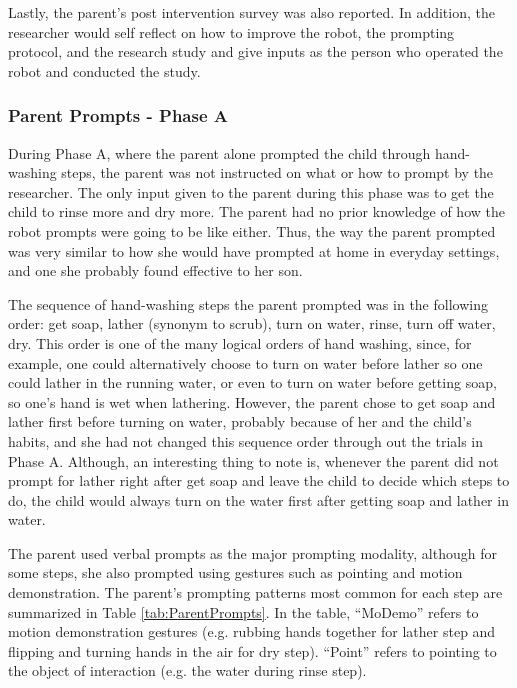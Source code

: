 Lastly, the parent's post intervention survey was also reported.  In addition, the researcher would self reflect on how to improve the robot, the prompting protocol, and the research study and give inputs as the person who operated the robot and conducted the study.

\subsubsection{Parent Prompts - Phase A}
During Phase A, where the parent alone prompted the child through hand-washing steps, the parent was not instructed on what or how to prompt by the researcher.  The only input given to the parent during this phase was to get the child to rinse more and dry more.  The parent had no prior knowledge of how the robot prompts were going to be like either.  Thus, the way the parent prompted was very similar to how she would have prompted at home in everyday settings, and one she probably found effective to her son.

The sequence of hand-washing steps the parent prompted was in the following order: get soap, lather (synonym to scrub), turn on water, rinse, turn off water, dry.  This order is one of the many logical orders of hand washing, since, for example, one could alternatively choose to turn on water before lather so one could lather in the running water, or even to turn on water before getting soap, so one's hand is wet when lathering.  However, the parent chose to get soap and lather first before turning on water, probably because of her and the child's habits, and she had not changed this sequence order through out the trials in Phase A.  Although, an interesting thing to note is, whenever the parent did not prompt for lather right after get soap and leave the child to decide which steps to do, the child would always turn on the water first after getting soap and lather in water.

The parent used verbal prompts as the major prompting modality, although for some steps, she also prompted using gestures such as pointing and motion demonstration.  The parent's prompting patterns most common for each step are summarized in Table \ref{tab:ParentPrompts}.  In the table, ``MoDemo'' refers to motion demonstration gestures (e.g. rubbing hands together for lather step and flipping and turning hands in the air for dry step).  ``Point'' refers to pointing to the object of interaction (e.g. the water during rinse step).

